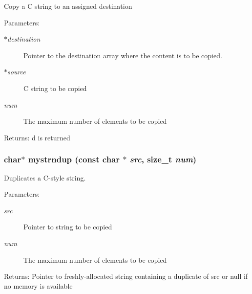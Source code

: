 Copy a C string to an assigned destination \begin{Desc}
\item[Parameters:]
\begin{description}
\item[{\em $\ast$destination}]Pointer to the destination array where the content is to be copied. \item[{\em $\ast$source}]C string to be copied \item[{\em num}]The maximum number of elements to be copied \end{description}
\end{Desc}
\begin{Desc}
\item[Returns:]d is returned \end{Desc}
\subsubsection{\setlength{\rightskip}{0pt plus 5cm}char$\ast$ mystrndup (const char $\ast$ {\em src}, size\_\-t {\em num})}\label{mystring_8c_0a1018503560c08ec35bea7a562cb31c}


Duplicates a C-style string. \begin{Desc}
\item[Parameters:]
\begin{description}
\item[{\em src}]Pointer to string to be copied \item[{\em num}]The maximum number of elements to be copied \end{description}
\end{Desc}
\begin{Desc}
\item[Returns:]Pointer to freshly-allocated string containing a duplicate of src or null if no memory is available \end{Desc}
